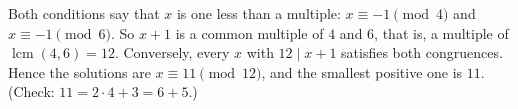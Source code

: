Both conditions say that $x$ is one less than a multiple: $x\equiv-1\pmod4$ and $x\equiv-1\pmod6$. So $x+1$ is a common multiple of $4$ and $6$, that is, a multiple of $\operatorname{lcm}(4,6)=12$. Conversely, every $x$ with $12\mid x+1$ satisfies both congruences. Hence the solutions are $x\equiv11\pmod{12}$, and the smallest positive one is $\boxed{11}$. (Check: $11=2\cdot4+3=6+5$.)
